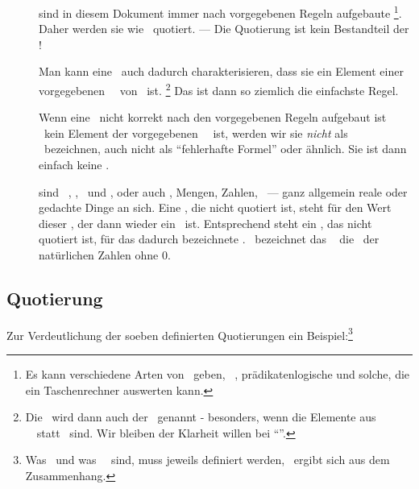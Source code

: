 \begin{description}
	\item [\Formeln] \label{def:Formel} sind in diesem Dokument immer nach vorgegebenen Regeln aufgebaute \Symbolfolgen%
	\footnote{%
		Es kann verschiedene Arten von \Formeln\ geben, \textzB\ \aussagenlogischeF, prädikatenlogische und solche, die ein Taschenrechner auswerten kann.
	}.
	Daher werden sie wie \Symbolfolgen\ quotiert.
	--- Die Quotierung ist kein Bestandteil der \Symbolfolge!

	Man kann eine \Formel\ auch dadurch charakterisieren, dass sie ein Element einer vorgegebenen \Menge\ \MtsSprache\ von \Symbolfolgen\ ist.%
	\footnote{%
		Die \Formel\ wird dann auch  der  \MtsSprache\ genannt - besonders, wenn die Elemente aus \MtsSprache\ \Zeichenketten\ statt \Symbolfolgen\ sind.
		Wir bleiben der Klarheit willen bei "`\Formel"'.
	}
	Das ist dann so ziemlich die einfachste Regel.

	Wenn eine \Symbolfolge\ nicht korrekt nach den vorgegebenen Regeln aufgebaut ist \textbzw\ kein Element der vorgegebenen \Menge\ \MtsSprache\ ist, werden wir sie \emph{nicht} als \Formel\ bezeichnen, auch nicht als "`fehlerhafte Formel"' oder ähnlich.
	Sie ist dann einfach keine \Formel.

	\item [\Objekte] sind \textzB\ \Symbole, \Zeichenketten, \Symbolfolgen\ und \Formeln, oder auch \Aussagen, Mengen, Zahlen, \textusw\ --- ganz allgemein reale oder gedachte Dinge an sich.
	Eine \Formel, die nicht quotiert ist, steht für den Wert dieser \Formel, der dann wieder ein \Objekt\ ist.
	Entsprechend steht ein \Symbol, das nicht quotiert ist, für das dadurch bezeichnete \Objekt.
	\textZB\ bezeichnet das \Symbol\ \chrqt{\MtsIN} die \Menge\ \MtsIN der natürlichen Zahlen ohne 0.

\end{description}

\subsection{Quotierung}%
\label {sub:Quotierung}

Zur Verdeutlichung der soeben definierten Quotierungen ein Beispiel:\footnote{%
	Was \atomare\ und was \zerlegbare\ \Symbole\ sind, muss jeweils definiert werden, \textbzw\ ergibt sich aus dem Zusammenhang.
}

